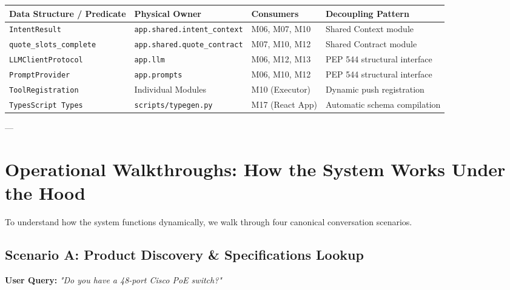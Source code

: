 \documentclass[11pt,a4paper]{article}
\begin{document}
\begin{table}[h]
\centering
\small
\begin{tabular}{llll}
\toprule
\textbf{Data Structure / Predicate} & \textbf{Physical Owner} & \textbf{Consumers} & \textbf{Decoupling Pattern} \\
\midrule
\texttt{IntentResult} & \texttt{app.shared.intent_context} & M06, M07, M10 & Shared Context module \\
\texttt{quote_slots_complete} & \texttt{app.shared.quote_contract} & M07, M10, M12 & Shared Contract module \\
\texttt{LLMClientProtocol} & \texttt{app.llm} & M06, M12, M13 & PEP 544 structural interface \\
\texttt{PromptProvider} & \texttt{app.prompts} & M06, M10, M12 & PEP 544 structural interface \\
\texttt{ToolRegistration} & Individual Modules & M10 (Executor) & Dynamic push registration \\
\texttt{TypesScript Types} & \texttt{scripts/typegen.py} & M17 (React App) & Automatic schema compilation \\
\bottomrule
\end{tabular}
\end{table}

---

\section{Operational Walkthroughs: How the System Works Under the Hood}

To understand how the system functions dynamically, we walk through four canonical conversation scenarios.

\subsection{Scenario A: Product Discovery \& Specifications Lookup}
\textbf{User Query:} \textit{"Do you have a 48-port Cisco PoE switch?"}
\end{document}
